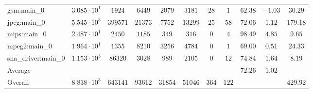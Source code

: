 \begin{tabular}{|l|c|c|c|c|c|c|c|c|c|c|}
gsm:main\_0             & $ 3.085 \cdot 10^{1} $ & $ 1924   $ & $ 6449  $ & $ 2079  $ & $ 3181  $ & $ 28  $ & $ 1   $ & $ 62.38       $ & $ -1.03   $ & $ 30.29   $ \\
jpeg:main\_0            & $ 5.545 \cdot 10^{3} $ & $ 399571 $ & $ 21373 $ & $ 7752  $ & $ 13299 $ & $ 25  $ & $ 58  $ & $ 72.06       $ & $ 1.12    $ & $ 179.18  $ \\
mips:main\_0            & $ 2.487 \cdot 10^{1} $ & $ 2450   $ & $ 1185  $ & $ 349   $ & $ 316   $ & $ 0   $ & $ 4   $ & $ 98.49       $ & $ 4.85    $ & $ 9.65    $ \\
mpeg2:main\_0           & $ 1.964 \cdot 10^{1} $ & $ 1355   $ & $ 8210  $ & $ 3256  $ & $ 4784  $ & $ 0   $ & $ 1   $ & $ 69.00       $ & $ 0.51    $ & $ 24.33   $ \\
sha\_driver:main\_0     & $ 1.153 \cdot 10^{3} $ & $ 86320  $ & $ 3028  $ & $ 989   $ & $ 2105  $ & $ 0   $ & $ 12  $ & $ 74.84       $ & $ 1.64    $ & $ 8.19    $ \\
\hline
Average                 & $                    $ & $        $ & $       $ & $       $ & $       $ & $     $ & $     $ & $ 72.26       $ & $ 1.02    $ & $         $ \\
\hline
Overall                 & $ 8.838 \cdot 10^{3} $ & $ 643141 $ & $ 93612 $ & $ 31854 $ & $ 51046 $ & $ 364 $ & $ 122 $ & $             $ & $         $ & $ 429.92  $ \\
\hline
\end{tabular}
